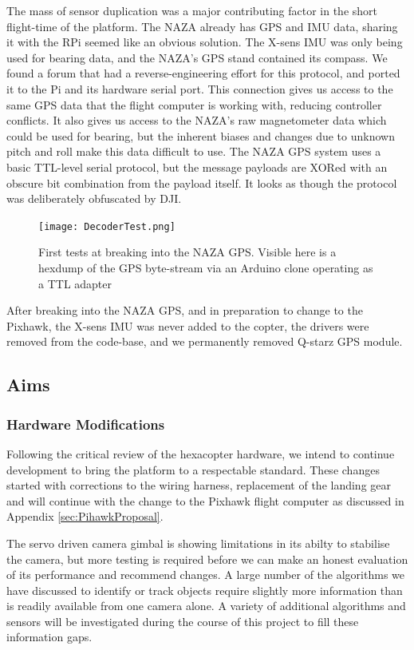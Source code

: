 \documentclass[a4paper, 11pt, titlepage]{article}
\begin{document}
      The mass of sensor duplication was a major contributing factor in the short flight-time of the platform.  The NAZA already has GPS and IMU data, sharing it with the RPi seemed like an obvious solution.  The X-sens IMU was only being used for bearing data, and the NAZA's GPS stand contained its compass.
      We found a forum that had a reverse-engineering effort for this protocol\cite{NAZArev}, and ported it to the Pi and its hardware serial port.  This connection gives us access to the same GPS data that the flight computer is working with, reducing controller conflicts. It also gives us access to the NAZA's raw magnetometer data which could be used for bearing, but the inherent biases and changes due to unknown pitch and roll make this data difficult to use.
      The NAZA GPS system uses a basic TTL-level serial protocol, but the message payloads are XORed with an obscure bit combination from the payload itself.  It looks as though the protocol was deliberately obfuscated by DJI.
      \begin{figure}[h!]
        \texttt{[image: DecoderTest.png]}
        \centering
        \caption{First tests at breaking into the NAZA GPS. Visible here is a hexdump of the GPS byte-stream via an Arduino clone operating as a TTL adapter}
      \end{figure}

      After breaking into the NAZA GPS, and in preparation to change to the Pixhawk, the X-sens IMU was never added to the copter, the drivers were removed from the code-base, and we permanently removed Q-starz GPS module.

  \subsection{Aims}

    \subsubsection{Hardware Modifications}
      Following the critical review of the hexacopter hardware, we intend to continue development to bring the platform to a respectable standard. These changes started with corrections to the wiring harness, replacement of the landing gear and will continue with the change to the Pixhawk flight computer as discussed in Appendix \ref{sec:PihawkProposal}.

      The servo driven camera gimbal is showing limitations in its abilty to stabilise the camera, but more testing is required before we can make an honest evaluation of its performance and recommend changes.
      A large number of the algorithms we have discussed to identify or track objects require slightly more information than is readily available from one camera alone.  A variety of additional algorithms and sensors will be investigated during the course of this project to fill these information gaps.
\end{document}
